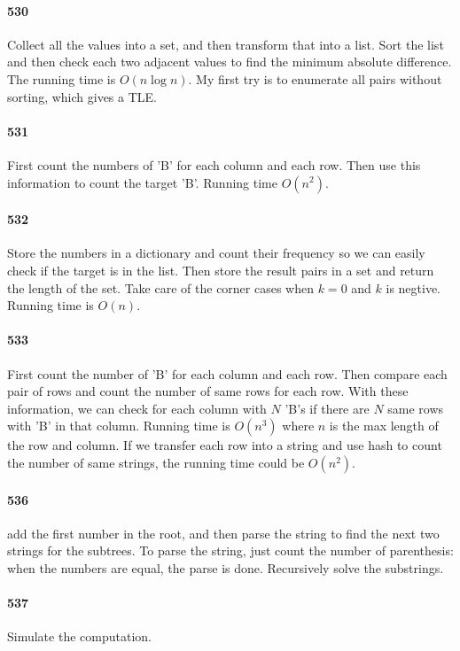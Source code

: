 \documentclass[11pt]{article}
\begin{document}
\begin{itemize}
\paragraph{530}
Collect all the values into a set, and then transform that into a list.
Sort the list and then check each two adjacent values to find the minimum absolute difference. 
The running time is $O(n \log n)$.
My first try is to enumerate all pairs without sorting, which gives a TLE.

\paragraph{531}
First count the numbers of 'B' for each column and each row. Then use this information to count the target 'B'.
Running time $O(n^2)$.


\paragraph{532}
Store the numbers in a dictionary and count their frequency so we can easily check if the target is in the list. 
Then store the result pairs in a set and return the length of the set. Take care of the corner cases when $k = 0$ 
and $k$ is negtive.
Running time is $O(n)$.


\paragraph{533}
First count the number of 'B' for each column and each row. Then compare each pair of rows and count the number of same rows
for each row. With these information, we can check for each column with $N$ 'B's if there are $N$ same rows with 'B' in that 
column. 
Running time is $O(n^3)$ where $n$ is the max length of the row and column. If we transfer each row into a string and use hash to count the number of same strings, the running time could be $O(n^2)$.

\paragraph{536}
add the first number in the root, and then parse the string to find the next two strings for the subtrees. To parse the 
string, just count the number of parenthesis: when the numbers are equal, the parse is done. Recursively solve the substrings.

\paragraph{537}
Simulate the computation.


\end{itemize}
\end{document}
